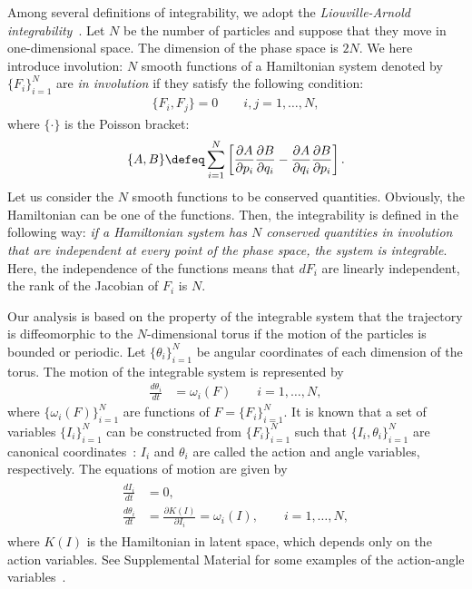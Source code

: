 
Among several definitions of integrability, we adopt the {\em Liouville-Arnold integrability}~\cite{Arnold-text,Perelomov-text,Arutyunov-text2019}.
Let $N$ be the number of particles and suppose that they move in one-dimensional space.
The dimension of the phase space is $2N$.
We here introduce involution: $N$ smooth functions of a Hamiltonian system denoted by $\{F_i\}_{i=1}^N$ are {\em in involution} if they satisfy the following condition:
\begin{align}
\{F_i, F_j\} = 0 \qquad i,j = 1, \ldots, N,
\end{align}
where $\{\cdot\}$ is the Poisson bracket:
\begin{align}
 \{A, B\} \defeq \sum_{i=1}^N
                 \left[\frac{\partial A}{\partial p_i}\frac{\partial B}{\partial q_i}
                 - \frac{\partial A}{\partial q_i}\frac{\partial B}{\partial p_i}\right].
\end{align}
Let us consider the $N$ smooth functions to be conserved quantities.
Obviously, the Hamiltonian can be one of the functions.
Then, the integrability is defined in the following way: {\em if a Hamiltonian system has $N$ conserved quantities in involution that are independent at every point of the phase space, the system is integrable}.
Here, the independence of the functions means that $dF_i$ are linearly independent, \ie the rank of the Jacobian of $F_i$ is $N$.

Our analysis is based on the property of the integrable system that the trajectory is diffeomorphic to the $N$-dimensional torus if the motion of the particles is bounded or periodic.
Let $\{\theta_i\}_{i=1}^{N}$ be angular coordinates of each dimension of the torus.
The motion of the integrable system is represented by
\begin{align}
   \frac{d\theta_i}{dt} & = \omega_i(F) \qquad i=1,\ldots,N,
\end{align}
where $\{\omega_i(F)\}_{i=1}^{N}$ are functions of $F=\{F_i\}_{i=1}^{N}$.
It is known that a set of variables $\{I_i\}_{i=1}^{N}$ can be constructed from $\{F_i\}_{i=1}^{N}$ such that $\{I_i,\theta_i\}_{i=1}^N$ are canonical coordinates~\cite{Arnold-text}: $I_i$ and $\theta_i$ are called the action and angle variables, respectively.
The equations of motion are given by
\begin{align}
 \begin{split}
   \frac{dI_i}{dt} & = 0, \\
   \frac{d\theta_i}{dt} & = \frac{\partial K(I)}{\partial I_i} = \omega_i(I), \qquad i=1,\ldots,N,
 \end{split} \label{eq:eom_of_action_angle_variabels}
\end{align}
where $K(I)$ is the Hamiltonian in latent space, which depends only on the action variables.
See Supplemental Material for some examples of the action-angle variables~\cite{our_supplemental_material}.

